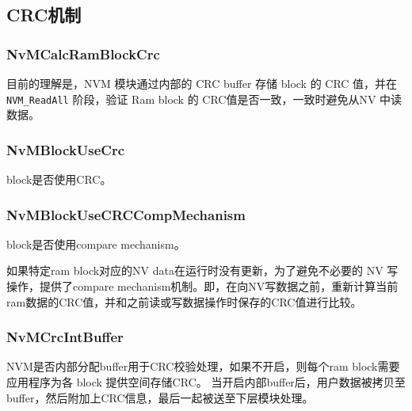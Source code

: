\subsection{CRC机制}

\subsubsection{NvMCalcRamBlockCrc}
\begin{remark}
  目前的理解是，NVM 模块通过内部的 CRC buffer 存储 block 的 CRC 值，并在 \lstinline{NVM_ReadAll} 阶段，验证 Ram block 的 CRC值是否一致，一致时避免从NV 中读数据。
\end{remark}

\subsubsection{NvMBlockUseCrc}
block是否使用CRC。


\subsubsection{NvMBlockUseCRCCompMechanism}

block是否使用compare mechanism。

如果特定ram block对应的NV data在运行时没有更新，为了避免不必要的 NV 写操作，提供了compare
mechanism机制。即，在向NV写数据之前，重新计算当前ram数据的CRC值，并和之前读或写数据操作时保存的CRC值进行比较。

\subsubsection{NvMCrcIntBuffer}

NVM是否内部分配buffer用于CRC校验处理，如果不开启，则每个ram block需要应用程序为各 block 提供空间存储CRC。
当开启内部buffer后，用户数据被拷贝至buffer，然后附加上CRC信息，最后一起被送至下层模块处理。


